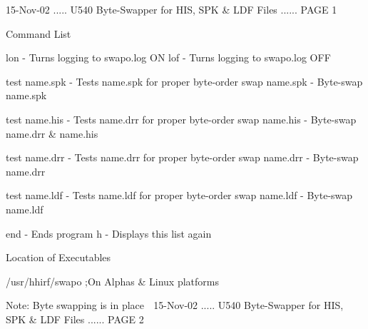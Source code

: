    15-Nov-02 ..... U540  Byte-Swapper for HIS, SPK & LDF Files ...... PAGE   1
 
   Command List
 
   lon            - Turns logging to swapo.log ON
   lof            - Turns logging to swapo.log OFF
 
   test  name.spk - Tests name.spk for proper byte-order
   swap  name.spk - Byte-swap name.spk
 
   test  name.his - Tests name.drr for proper byte-order
   swap  name.his - Byte-swap name.drr & name.his
 
   test  name.drr - Tests name.drr for proper byte-order
   swap  name.drr - Byte-swap name.drr
 
   test  name.ldf - Tests name.ldf for proper byte-order
   swap  name.ldf - Byte-swap name.ldf
 
   end            - Ends program
   h              - Displays this list again
 
   Location of Executables
 
   /usr/hhirf/swapo                ;On Alphas & Linux platforms
 
   Note: Byte swapping is in place
    
   15-Nov-02 ..... U540  Byte-Swapper for HIS, SPK & LDF Files ...... PAGE   2
